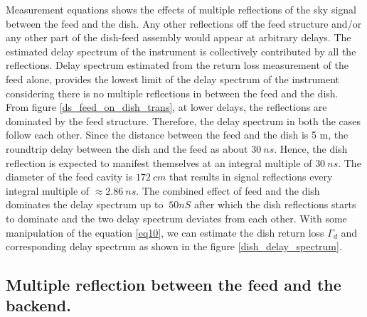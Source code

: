\documentclass[twocolumn]{emulateapj}
\begin{document}
Measurement equations shows the effects of multiple reflections of the sky
signal between the feed and the dish. Any other reflections off the feed
structure and/or any other part of the dish-feed assembly would appear at
arbitrary delays. The estimated delay spectrum of the instrument is
collectively contributed by all the reflections. Delay spectrum estimated from
the return loss measurement of the feed alone,  provides the lowest limit of
the delay spectrum of the instrument considering there is no multiple
reflections in between the feed and the dish.  From figure
\ref{ds_feed_on_dish_trans}, at lower delays, the reflections are dominated by
the feed structure. Therefore, the delay spectrum in both the cases follow each
other. Since the distance between the feed and the dish is 5 m, the roundtrip
delay between the dish and the feed as about $30~ns$. Hence, the dish
reflection is expected to manifest themselves at an integral multiple of
$30~ns$. The diameter of the feed cavity is $172~cm$  that results in signal
reflections every integral multiple of $\approx2.86~ns$. The combined effect of
feed and the dish dominates the delay spectrum up to $\> 50nS$ after which the
dish reflections starts to dominate and the two delay spectrum deviates from
each other. With some manipulation of the equation \ref{eq10}, we can estimate
the dish return loss $\Gamma_{d}$ and corresponding delay spectrum as shown in
the figure \ref{dish_delay_spectrum}.

\subsection{Multiple reflection between the feed and the backend.}
\end{document}
